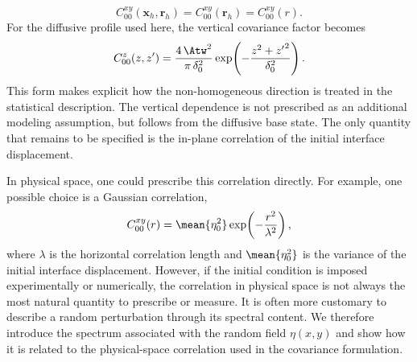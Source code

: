 \begin{equation}
    C_{00}^{xy}(\boldsymbol{x}_h,\boldsymbol{r}_h)
    =
    C_{00}^{xy}(\boldsymbol{r}_h)
    =
    C_{00}^{xy}(r).
    \label{eq:eta_correlation_homogeneous_isotropic}
\end{equation}
For the diffusive profile used here, the vertical covariance factor becomes
\begin{equation}
    C_{00}^{z}(z,z')
    =
    \frac{4\,\Atw^{2}}{\pi\,\delta_0^{2}}
    \exp\!\left(
        -\frac{z^2+{z'}^2}{\delta_0^2}
    \right).
    \label{eq:vertical_covariance_factor_erf}
\end{equation}
This form makes explicit how the non-homogeneous direction is treated in the statistical description. The vertical dependence is not prescribed as an additional modeling assumption, but follows from the diffusive base state. The only quantity that remains to be specified is the in-plane correlation of the initial interface displacement.

In physical space, one could prescribe this correlation directly. For example, one possible choice is a Gaussian correlation,
\begin{equation}
    C_{00}^{xy}(r)
    =
    \mean{\eta_0^2}
    \exp\!\left(-\frac{r^2}{\lambda^2}\right),
    \label{eq:gaussian_eta_correlation}
\end{equation}
where \(\lambda\) is the horizontal correlation length and \(\mean{\eta_0^2}\) is the variance of the initial interface displacement. However, if the initial condition is imposed experimentally or numerically, the correlation in physical space is not always the most natural quantity to prescribe or measure. It is often more customary to describe a random perturbation through its spectral content. We therefore introduce the spectrum associated with the random field \(\eta(x,y)\) and show how it is related to the physical-space correlation used in the covariance formulation.

